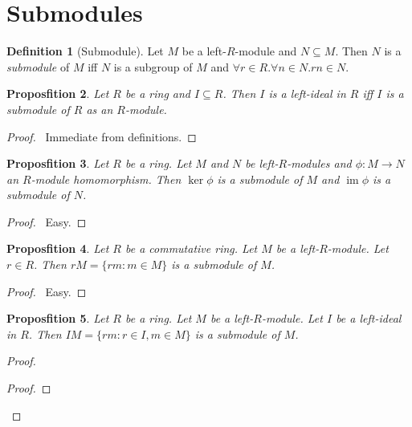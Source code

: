 \documentclass{book}
\let\qed\relax
\newtheorem{prop}{Proposfition}[chapter]
\theoremstyle{definition}
\newtheorem{df}[prop]{Definition}
\newcommand{\im}{\ensuremath{\operatorname{im}}}
\begin{document}
\section{Submodules}

\begin{df}[Submodule]
Let $M$ be a left-$R$-module and $N \subseteq M$. Then $N$ is a \emph{submodule} of $M$ iff $N$ is a subgroup of $M$ and $\forall r \in R. \forall n \in N. rn \in N$.
\end{df}

\begin{prop}
Let $R$ be a ring and $I \subseteq R$. Then $I$ is a left-ideal in $R$ iff $I$ is a submodule of $R$ as an $R$-module.
\end{prop}

\begin{proof}
\pf\ Immediate from definitions. \qed
\end{proof}

\begin{prop}
Let $R$ be a ring. Let $M$ and $N$ be left-$R$-modules and $\phi : M \rightarrow N$ an $R$-module homomorphism. Then $\ker \phi$ is a submodule of $M$ and $\im \phi$ is a submodule of $N$.
\end{prop}

\begin{proof}
\pf\ Easy. \qed
\end{proof}

\begin{prop}
Let $R$ be a commutative ring. Let $M$ be a left-$R$-module. Let $r \in R$. Then $rM = \{ rm : m \in M \}$ is a submodule of $M$.
\end{prop}

\begin{proof}
\pf\ Easy. \qed
\end{proof}

\begin{prop}
Let $R$ be a ring. Let $M$ be a left-$R$-module. Let $I$ be a left-ideal in $R$. Then $IM = \{ rm : r \in I, m \in M \}$ is a submodule of $M$.
\end{prop}

\begin{proof}
\pf
{}
\begin{proof}
\end{proof}
\qed
\end{proof}
\end{document}
